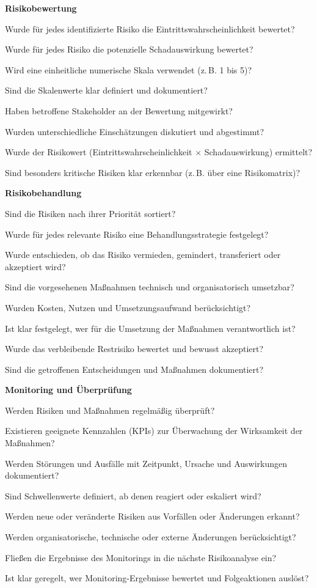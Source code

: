 \textbf{Risikobewertung}
\begin{checklist}
  \item Wurde für jedes identifizierte Risiko die Eintrittswahrscheinlichkeit bewertet?
  \item Wurde für jedes Risiko die potenzielle Schadauswirkung bewertet?
  \item Wird eine einheitliche numerische Skala verwendet (z.\,B. 1 bis 5)?
  \item Sind die Skalenwerte klar definiert und dokumentiert?
  \item Haben betroffene Stakeholder an der Bewertung mitgewirkt?
  \item Wurden unterschiedliche Einschätzungen diskutiert und abgestimmt?
  \item Wurde der Risikowert (Eintrittswahrscheinlichkeit $\times$ Schadauswirkung) ermittelt?
  \item Sind besonders kritische Risiken klar erkennbar (z.\,B. über eine Risikomatrix)?
\end{checklist}
\vspace{1em}

\textbf{Risikobehandlung}
\begin{checklist}
  \item Sind die Risiken nach ihrer Priorität sortiert?
  \item Wurde für jedes relevante Risiko eine Behandlungsstrategie festgelegt?
  \item Wurde entschieden, ob das Risiko vermieden, gemindert, transferiert oder akzeptiert wird?
  \item Sind die vorgesehenen Maßnahmen technisch und organisatorisch umsetzbar?
  \item Wurden Kosten, Nutzen und Umsetzungsaufwand berücksichtigt?
  \item Ist klar festgelegt, wer für die Umsetzung der Maßnahmen verantwortlich ist?
  \item Wurde das verbleibende Restrisiko bewertet und bewusst akzeptiert?
  \item Sind die getroffenen Entscheidungen und Maßnahmen dokumentiert?
\end{checklist}
\newpage
\textbf{Monitoring und Überprüfung}
\begin{checklist}
  \item Werden Risiken und Maßnahmen regelmäßig überprüft?
  \item Existieren geeignete Kennzahlen (KPIs) zur Überwachung der Wirksamkeit der Maßnahmen?
  \item Werden Störungen und Ausfälle mit Zeitpunkt, Ursache und Auswirkungen dokumentiert?
  \item Sind Schwellenwerte definiert, ab denen reagiert oder eskaliert wird?
  \item Werden neue oder veränderte Risiken aus Vorfällen oder Änderungen erkannt?
  \item Werden organisatorische, technische oder externe Änderungen berücksichtigt?
  \item Fließen die Ergebnisse des Monitorings in die nächste Risikoanalyse ein?
  \item Ist klar geregelt, wer Monitoring-Ergebnisse bewertet und Folgeaktionen auslöst?
\end{checklist}
